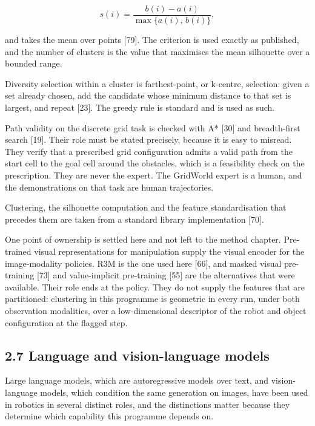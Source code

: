 \documentclass[
  11pt,
]{article}
\begin{document}
\[s(i) = \frac{b(i) - a(i)}{\max\{a(i),\, b(i)\}},\]

and takes the mean over points {[}79{]}. The criterion is used exactly
as published, and the number of clusters is the value that maximises the
mean silhouette over a bounded range.

Diversity selection within a cluster is farthest-point, or k-centre,
selection: given a set already chosen, add the candidate whose minimum
distance to that set is largest, and repeat {[}23{]}. The greedy rule is
standard and is used as such.

Path validity on the discrete grid task is checked with A* {[}30{]} and
breadth-first search {[}19{]}. Their role must be stated precisely,
because it is easy to misread. They verify that a prescribed grid
configuration admits a valid path from the start cell to the goal cell
around the obstacles, which is a feasibility check on the prescription.
They are never the expert. The GridWorld expert is a human, and the
demonstrations on that task are human trajectories.

Clustering, the silhouette computation and the feature standardisation
that precedes them are taken from a standard library implementation
{[}70{]}.

One point of ownership is settled here and not left to the method
chapter. Pre-trained visual representations for manipulation supply the
visual encoder for the image-modality policies. R3M is the one used here
{[}66{]}, and masked visual pre-training {[}73{]} and value-implicit
pre-training {[}55{]} are the alternatives that were available. Their
role ends at the policy. They do not supply the features that are
partitioned: clustering in this programme is geometric in every run,
under both observation modalities, over a low-dimensional descriptor of
the robot and object configuration at the flagged step.

\hypertarget{language-and-vision-language-models}{%
\subsection{2.7 Language and vision-language
models}\label{language-and-vision-language-models}}

Large language models, which are autoregressive models over text, and
vision-language models, which condition the same generation on images,
have been used in robotics in several distinct roles, and the
distinctions matter because they determine which capability this
programme depends on.
\end{document}
